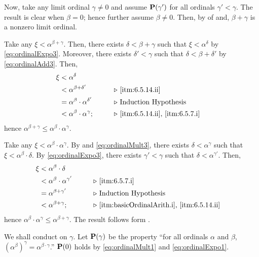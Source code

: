 \documentclass[../introduction_to_set_theory_Note.tex]{subfiles}
\begin{document}
{\begin{enumerate}[nolistsep, label=(\roman*), leftmargin=*, listparindent=\parindent]
    Now, take any limit ordinal \(\gamma \neq 0\) and assume
    \(\bm{\mathrm{P}}(\gamma')\) for all ordinals \(\gamma' < \gamma\).
    The result is clear when \(\beta = 0\); hence further assume \(\beta \neq 0\).
    Then, by  of  and, \(\beta + \gamma\)
    is a nonzero limit ordinal.

    Take any \(\xi < \alpha^{\beta + \gamma}\).
    Then, there exists \(\delta < \beta + \gamma\) such that
    \(\xi < \alpha^\delta\) by \eqref{eq:ordinalExpo3}.
    Moreover, there exists \(\delta' < \gamma\) such that
    \(\delta < \beta + \delta'\) by \eqref{eq:ordinalAdd3}.
    Then,
    \begin{alignat*}{2}
        \xi
        &< \alpha^\delta &\qquad \\
        &< \alpha^{\beta + \delta'} &\qquad& \comment*{\ref{itm:6.5.14.ii}} \\
        &= \alpha^\beta \cdot \alpha^{\delta'} && \comment*{Induction Hypothesis} \\
        &< \alpha^\beta \cdot \alpha^\gamma; && \comment*{\ref{itm:6.5.14.ii}, \ref{itm:6.5.7.i}}
    \end{alignat*}
    hence \(\alpha^{\beta + \gamma} \le \alpha^\beta \cdot \alpha^\gamma\).

    Take any \(\xi < \alpha^\beta \cdot \alpha^\gamma\).
    By  and \eqref{eq:ordinalMult3},
    there exists \(\delta < \alpha^\gamma\) such that \(\xi < \alpha^\beta \cdot \delta\).
    By \eqref{eq:ordinalExpo3}, there exists \(\gamma' < \gamma\) such that \(\delta < \alpha^{\gamma'}\).
    Then,
    \begin{alignat*}{2}
        \xi
        &< \alpha^\beta \cdot \delta &\qquad \\
        &< \alpha^\beta \cdot \alpha^{\gamma'} && \comment*{\ref{itm:6.5.7.i}} \\
        &= \alpha^{\beta + \gamma'} && \comment*{Induction Hypothesis} \\
        &< \alpha^{\beta + \gamma}; && \comment*{\ref{itm:basicOrdinalArith.i}, \ref{itm:6.5.14.ii}}
    \end{alignat*}
    hence \(\alpha^\beta \cdot \alpha^\gamma \le \alpha^{\beta + \gamma}\).
    The result follows form .

    \ii
    We shall conduct  on \(\gamma\).
    Let \(\bm{\mathrm{P}}(\gamma)\) be the property
    ``for all ordinals \(\alpha\) and \(\beta\), \((\alpha^\beta)^\gamma = \alpha^{\beta \cdot \gamma}\).''
    \(\bm{\mathrm{P}}(0)\) holds by \eqref{eq:ordinalMult1} and \eqref{eq:ordinalExpo1}.


\end{enumerate}}
\end{document}

